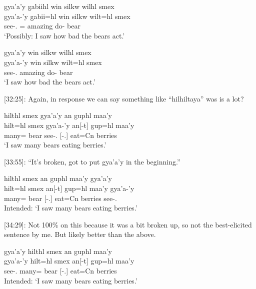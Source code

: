 \begin{exe}
    \ex 
    \begin{xlist}
        \item \glll gya'a'y g̱abiihl win silkw wilhl smex \\
    gya'a-'y g̱abii=hl win silkw wilt=hl smex \\
    see-\Fsg{}.\Ii{} \Cnt{}=\Cn{} \Comp{} amazing do-\Cn{} bear \\
    `Possibly: I saw how bad the bears act.'

    \item \glll gya'a'y win silkw wilhl smex \\
    gya'a-'y win silkw wilt=hl smex \\
    see-\Fsg{}.\Ii{} \Comp{} amazing do-\Cn{} bear \\
    `I saw how bad the bears act.'
    \end{xlist}
\end{exe}

[32:25]: Again, in response we can say something like ``hilhiltaya'' was is a lot?

\begin{exe}
    \ex \glll hilthl smex gya'a'y an guphl maa'y \\
    hilt=hl smex gya'a-'y an[-t] gup=hl maa'y \\
    many=\Cn{} bear see-\Fsg{}.\Ii{} \Sx{}[-\Tsg{}.\Ii{}] eat=Cn{} berries \\
    `I saw many bears eating berries.'
\end{exe}

[33:55]: ``It's broken, got to put gya'a'y in the beginning.''

\begin{exe}
    \ex \glll * hilthl smex an guphl maa'y  gya'a'y\\
    {} hilt=hl smex an[-t] gup=hl maa'y  gya'a-'y\\
    {} many=\Cn{} bear  \Sx{}[-\Tsg{}.\Ii{}] eat=Cn{} berries see-\Fsg{}.\Ii{}\\
    Intended: `I saw many bears eating berries.'
\end{exe}

[34:29]: Not 100\% on this because it was a bit broken up, so not the best-elicited sentence by me. But likely better than the above.

\begin{exe}
    \ex \glll gya'a'y hilthl smex an guphl maa'y \\
    gya'a-'y hilt=hl smex an[-t] gup=hl maa'y \\
    see-\Fsg{}.\Ii{} many=\Cn{} bear  \Sx{}[-\Tsg{}.\Ii{}] eat=Cn{} berries\\
    Intended: `I saw many bears eating berries.'
\end{exe}




